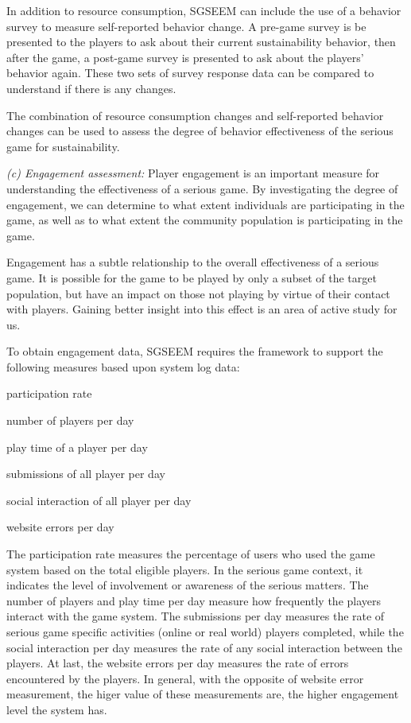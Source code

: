 \documentclass{sigchi}
\begin{document}
In addition to resource consumption, SGSEEM can include the use of a
behavior survey to measure self-reported behavior
change. A pre-game survey is be presented to the players to ask about
their current sustainability behavior, then after the game, a post-game
survey is presented to ask about the players' behavior again. These two
sets of survey response data can be compared to understand if there is
any changes.

The combination of resource consumption changes and self-reported
behavior changes can be used to assess the degree of behavior
effectiveness of the serious game for sustainability.

\emph {(c) Engagement assessment:} Player engagement is an important measure for
understanding the effectiveness of a serious game. By investigating the degree of
engagement, we can determine to what extent individuals are participating in the game, as
well as to what extent the community population is participating in the game.


Engagement has a subtle relationship to the overall effectiveness of a serious game. It is
possible for the game to be played by only a subset of the target population, but
have an impact on those not playing by virtue of their contact with players. Gaining 
better insight into this effect is an area of active study for us. 

To obtain engagement data, SGSEEM requires the framework to support the following measures
based upon system log data: 

\begin{compactitem}
\item participation rate
\item number of players per day
\item play time of a player per day
\item submissions of all player per day
\item social interaction of all player per day
\item website errors per day
\end{compactitem}

The participation rate measures the percentage of users who used the game system based on the total eligible players. In the serious game context, it indicates the level of involvement or awareness of the serious matters. The number of players and play time per day measure how frequently the players interact with the game system. The submissions per day measures the rate of serious game specific activities (online or real world) players completed, while the social interaction per day measures the rate of any social interaction between the players. At last, the website errors per day measures the rate of errors encountered by the players. In general, with the opposite of website error measurement, the higer value of these measurements are, the higher engagement level the system has.
\end{document}
